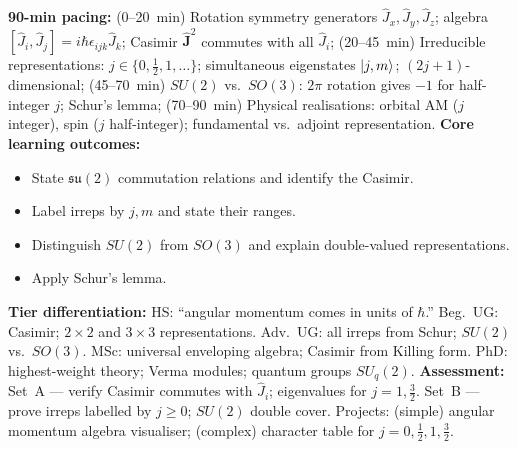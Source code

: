 \documentclass[11pt,a4paper]{article}
\begin{document}
\begin{tcolorbox}[modulebox, title={Module~II.3 / L01: The $\mathfrak{su}(2)$ Algebra}]
\textbf{90-min pacing:} (0--20~min) Rotation symmetry generators $\hat{J}_x,\hat{J}_y,\hat{J}_z$; algebra $[\hat{J}_i,\hat{J}_j]=i\hbar\epsilon_{ijk}\hat{J}_k$; Casimir $\hat{\mathbf{J}}^2$ commutes with all $\hat{J}_i$; (20--45~min) Irreducible representations: $j\in\{0,\tfrac{1}{2},1,\ldots\}$; simultaneous eigenstates $\ket{j,m}$; $(2j+1)$-dimensional; (45--70~min) $SU(2)$ vs.\ $SO(3)$: $2\pi$ rotation gives $-1$ for half-integer $j$; Schur's lemma; (70--90~min) Physical realisations: orbital AM ($j$ integer), spin ($j$ half-integer); fundamental vs.\ adjoint representation.
\medskip\textbf{Core learning outcomes:}
\begin{itemize}[leftmargin=1.4em,topsep=2pt,itemsep=1pt]
  \item State $\mathfrak{su}(2)$ commutation relations and identify the Casimir.
  \item Label irreps by $j,m$ and state their ranges.
  \item Distinguish $SU(2)$ from $SO(3)$ and explain double-valued representations.
  \item Apply Schur's lemma.
\end{itemize}
\medskip\textbf{Tier differentiation:}
HS: ``angular momentum comes in units of $\hbar$.''
Beg.\ UG: Casimir; $2\times2$ and $3\times3$ representations.
Adv.\ UG: all irreps from Schur; $SU(2)$ vs.\ $SO(3)$.
MSc: universal enveloping algebra; Casimir from Killing form.
PhD: highest-weight theory; Verma modules; quantum groups $SU_q(2)$.
\medskip\textbf{Assessment:}
Set~A --- verify Casimir commutes with $\hat{J}_i$; eigenvalues for $j=1,\tfrac{3}{2}$.
Set~B --- prove irreps labelled by $j\geq 0$; $SU(2)$ double cover.
Projects: (simple) angular momentum algebra visualiser; (complex) character table for $j=0,\tfrac{1}{2},1,\tfrac{3}{2}$.
\end{tcolorbox}

\medskip
\end{document}
